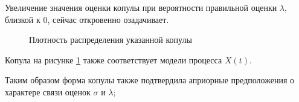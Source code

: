 Увеличение значения оценки копулы при вероятности правильной оценки $\lambda$, близкой к 0, сейчас откровенно озадачивает.

\begin{figure}[H]
	{}
	\caption{Плотность распределения указанной копулы}
	\label{fig:biglambda}
\end{figure}
Копула на рисунке \ref{fig:biglambda} также соответствует модели процесса $X(t)$.

Таким образом форма копулы также подтвердила априорные предположения о характере связи оценок $\sigma$ и $\lambda$;

\clearpage